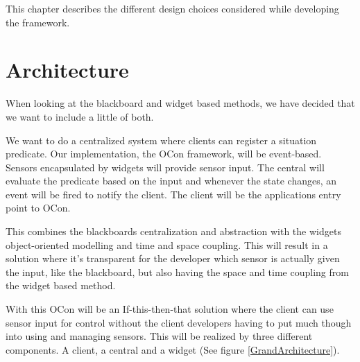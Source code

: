 \documentclass[../report.tex]{subfiles}
\begin{document}
\graphicspath{{img/}{../img/}}
This chapter describes the different design choices considered while developing the framework.

%
%

\section{Architecture}
When looking at the blackboard and widget based methods, we have decided that we want to include a little of both.

We want to do a centralized system where clients can register a situation predicate. Our implementation, the OCon framework, will be event-based. Sensors encapsulated by widgets will provide sensor input. The central will evaluate the predicate based on the input and whenever the state changes, an event will be fired to notify the client. The client will be the applications entry point to OCon.

This combines the blackboards centralization and abstraction with the widgets object-oriented modelling and time and space coupling. This will result in a solution where it's transparent for the developer which sensor is actually given the input, like the blackboard, but also having the space and time coupling from the widget based method.

With this OCon will be an If-this-then-that solution where the client can use sensor input for control without the client developers having to put much though into using and managing sensors. This will be realized by three different components. A client, a central and a widget (See figure \ref{GrandArchitecture}).
\end{document}
